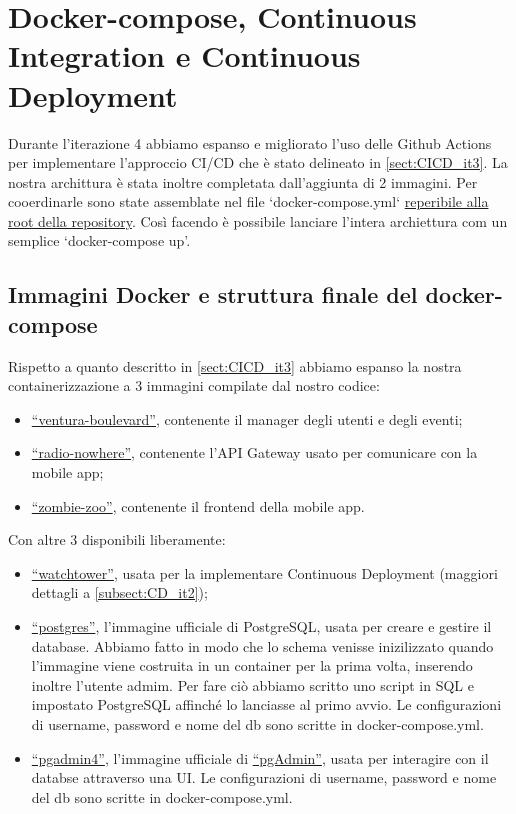 \section{Docker-compose, Continuous Integration e Continuous Deployment}
Durante l'iterazione 4 abbiamo espanso e migliorato l'uso delle Github Actions per implementare l'approccio CI/CD che è stato delineato in \ref{sect:CICD_it3}.
La nostra archittura è stata inoltre completata dall'aggiunta di 2 immagini. Per cooerdinarle sono state assemblate nel file `docker-compose.yml` \href{https://github.com/FI-153/Progetto-PAC-2023-24/blob/main/docker-compose.yml}{reperibile alla root della repository}. Così facendo è possibile lanciare l'intera archiettura com un semplice `docker-compose up'.
\subsection{Immagini Docker e struttura finale del docker-compose}
Rispetto a quanto descritto in \ref{sect:CICD_it3} abbiamo espanso la nostra containerizzazione a 3 immagini compilate dal nostro codice:
\begin{itemize}
  \item \href{https://hub.docker.com/repository/docker/freddy153/ventura_boulevard/general}{``ventura-boulevard''}, contenente il manager degli utenti e degli eventi;
  \item \href{https://hub.docker.com/repository/docker/freddy153/radio_nowhere/general}{``radio-nowhere''}, contenente l'API Gateway usato per comunicare con la mobile app;
  \item \href{https://hub.docker.com/repository/docker/freddy153/zombie_zoo/general}{``zombie-zoo''}, contenente il frontend della mobile app.
\end{itemize}
Con altre 3 disponibili liberamente:
\begin{itemize}
  \item \href{https://github.com/containrrr/watchtower}{``watchtower''}, usata per la implementare Continuous Deployment (maggiori dettagli a \ref{subsect:CD_it2});
  \item \href{https://hub.docker.com/_/postgres}{``postgres''}, l'immagine ufficiale di PostgreSQL, usata per creare e gestire il database. Abbiamo fatto in modo che lo schema venisse inizilizzato quando l'immagine viene costruita in un container per la prima volta, inserendo inoltre l'utente admim. Per fare ciò abbiamo scritto uno script in SQL e impostato PostgreSQL affinché lo lanciasse al primo avvio. Le configurazioni di username, password e nome del db sono scritte in docker-compose.yml.
  \item \href{https://hub.docker.com/r/dpage/pgadmin4/}{``pgadmin4''}, l'immagine ufficiale di \href{https://www.pgadmin.org}{``pgAdmin''}, usata per interagire con il databse attraverso una UI. Le configurazioni di username, password e nome del db sono scritte in docker-compose.yml.
\end{itemize}
\newpage
